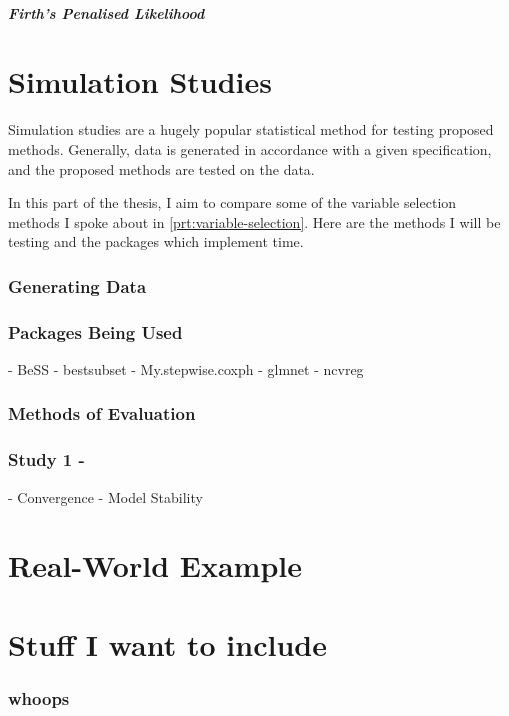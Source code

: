 \subsubsection{Firth's Penalised Likelihood}

\fi

\part{Simulation Studies}

Simulation studies are a hugely popular statistical method for testing proposed methods. Generally, data is generated in accordance with a given specification, and the proposed methods are tested on the data. 

In this part of the thesis, I aim to compare some of the variable selection methods I spoke about in \cref{prt:variable-selection}. Here are the methods I will be testing and the packages which implement time.

\section{Generating Data}

\section{Packages Being Used}
- BeSS
- bestsubset
- My.stepwise.coxph
- glmnet
- ncvreg

\section{Methods of Evaluation}

\section{Study 1 - }
- Convergence
- Model Stability


\iffalse

\part{Real-World Example}

\part{Stuff I want to include}

\section{whoops}
